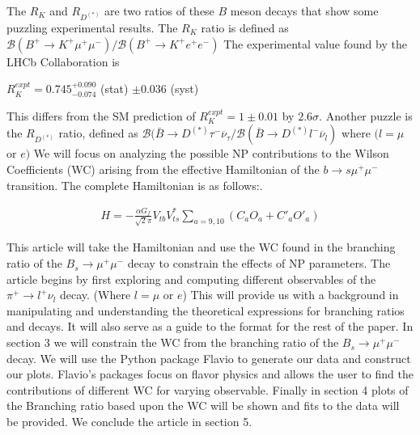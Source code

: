 \documentclass[12pt]{article}
\def \bea{\begin{eqnarray}}
\def \eea{\end{eqnarray}}
\def \onu{\overline{\nu}}
\def \si{\sigma}
\begin{document}
The $R_K$ and $R_{D^{(*)}}$ are two ratios of these $B$ meson decays that show some puzzling experimental results. The $R_K$ ratio is defined as $\mathcal{B}(B^+\rightarrow K^+\mu^+\mu^-)/ \mathcal{B}(B^+\rightarrow K^+e^+e^-)$ The experimental value found by the LHCb Collaboration is \cite{Aaij:2014ora}
\begin{center}
$R^{expt}_{K} = 0.745 _{\num{-0.074}}^{+0.090}$ (stat) $\pm 0.036$ (syst)
\end{center}
This differs from the SM prediction of $R^{expt}_{K} = 1 \pm 0.01$ by $2.6\si$. \cite{Bordone:2016gaq} Another puzzle is the $R_{D^{(*)}}$ ratio, defined as $\mathcal{B}(\bar{B} \rightarrow D^{(*)}\tau^- \onu_{\tau}/ \mathcal{B}(\bar{B} \rightarrow D^{(*)}l^- \onu_{l})$ where $(l= \mu$ or $e)$  We will focus on analyzing the possible NP contributions to the Wilson Coefficients (WC) arising from the effective Hamiltonian of the $b \rightarrow s\mu^+\mu^-$ transition. The complete Hamiltonian is as follows:\cite{Bhattacharya:2016mcc}. 
\begin{center}
\bea
H = -\frac{\alpha G_f}{\sqrt{2}\pi} V_{tb}V^*_{ts}\sum_{a= 9,10}^{}(C_aO_a + C'_aO'_a)
\eea
\end{center}
This article will take the Hamiltonian and use the WC found in the branching ratio of the $B_s \rightarrow \mu^+ \mu^- $ decay to constrain the effects of NP parameters. The article begins by first exploring and computing different observables of the $\pi^+ \rightarrow l^+ \nu_l $ decay. (Where $l= \mu$ or $e$) This will provide us with a background in manipulating and understanding the theoretical expressions for branching ratios and decays. It will also serve as a guide to the format for the rest of the paper. In section 3 we will constrain the WC from the branching ratio of the $B_s \rightarrow \mu^+\mu^-$ decay. We will use the Python package Flavio\cite{flavio} to generate our data and construct our plots. Flavio's packages focus on flavor physics and allows the user to find the contributions of different WC for varying observable. Finally in section 4 plots of the Branching ratio based upon the WC will be shown and fits to the data will be provided. We conclude the article in section 5.
\end{document}
